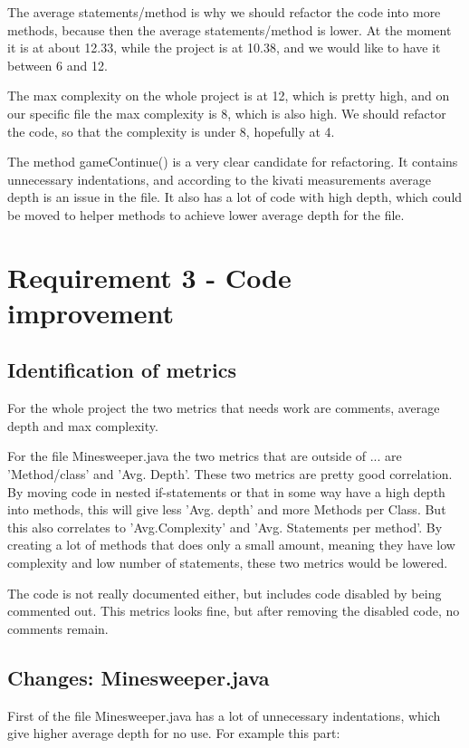 \documentclass[UKenglish]{article}  %
\begin{document}
The average statements/method is why we should refactor the code into more methods, because then the average statements/method is lower. At the moment it is at about 12.33, while the project is at 10.38, and we would like to have it between 6 and 12. 

The max complexity on the whole project is at 12, which is pretty high, and on our specific file the max complexity is 8, which is also high. We should refactor the code, so that the complexity is under 8, hopefully at 4. 

The method gameContinue() is a very clear candidate for refactoring. It contains
unnecessary indentations, and according to the kivati measurements average depth
is an issue in the file. It also has a lot of code with high depth, which could
be moved to helper methods to achieve lower average depth for the file.

\section{Requirement 3 - Code improvement}
\subsection{Identification of metrics}
For the whole project the two metrics that needs work are comments, average
depth and max complexity. 

For the file Minesweeper.java the two metrics that are outside of ... are 
'Method/class' and 'Avg. Depth'. These two metrics are pretty good correlation.
By moving code in nested if-statements or that in some way have a high depth 
into methods, this will give less 'Avg. depth' and more Methods per Class. 
But this also correlates to 'Avg.Complexity' and 'Avg. Statements per method'.
By creating a lot of methods that does only a small amount, meaning they have
low complexity and low number of statements, these two metrics would be lowered.

The code is not really documented either, but includes code disabled by being
commented out. This metrics looks fine, but after removing the disabled code,
no comments remain.

\subsection{Changes: Minesweeper.java}
First of the file Minesweeper.java has a lot of unnecessary indentations, which
give higher average depth for no use. For example this part:
\end{document}
